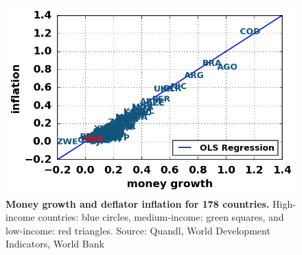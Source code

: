 \begin{figure}[h]
\caption{\label{fig_moneyInflationCoded} \textbf{Money growth and deflator inflation for 178 countries.} High-income countries: blue circles, medium-income: green squares, and low-income: red triangles. {\tiny Source: Quandl, World Development Indicators, World Bank}}
\hspace*{-.5cm}\includegraphics[height = 7.cm]{fig_moneyInflationCoded.png}
\end{figure}